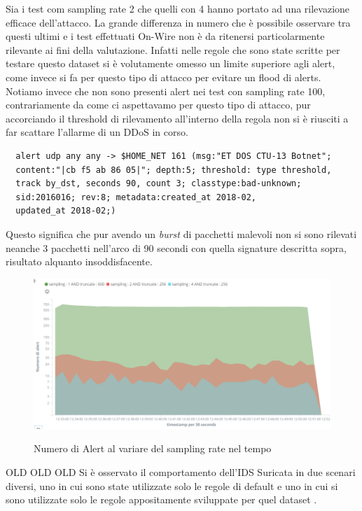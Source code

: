 \documentclass[12pt,a4paper,openright,twoside]{report}
\begin{document}
Sia i test com sampling rate 2 che quelli con 4 hanno portato ad una rilevazione efficace
dell'attacco. La grande differenza in numero che \`e possibile osservare tra questi ultimi e
i test effettuati On-Wire non \`e da ritenersi particolarmente rilevante ai fini della
valutazione. Infatti nelle regole che sono state scritte per testare questo dataset
si \`e volutamente omesso un limite superiore agli alert, come invece si fa per questo
tipo di attacco per evitare un flood di alerts.
Notiamo invece che non sono presenti alert nei test con sampling rate 100, contrariamente
da come ci aspettavamo per questo tipo di attacco, pur accorciando il threshold di rilevamento
all'interno della regola non si \`e riusciti a far scattare l'allarme di un DDoS in corso.
\begin{verbatim}
  alert udp any any -> $HOME_NET 161 (msg:"ET DOS CTU-13 Botnet";
  content:"|cb f5 ab 86 05|"; depth:5; threshold: type threshold,
  track by_dst, seconds 90, count 3; classtype:bad-unknown;
  sid:2016016; rev:8; metadata:created_at 2018-02,
  updated_at 2018-02;)
\end{verbatim}

Questo significa che pur avendo un {\it burst} di pacchetti malevoli non si sono
rilevati neanche 3 pacchetti nell'arco di 90 secondi con quella signature descritta
sopra, risultato alquanto insoddisfacente.

\begin{figure}[h!]
\begin{center}                          %
  \includegraphics[width=\textwidth]{images/CTU-time.png}
  \caption{Numero di Alert al variare del sampling rate nel tempo}\label{ctu:time}
  \label{}
\end{center}
\end{figure}

\newpage
\clearpage
OLD OLD OLD
Si \`e osservato il comportamento dell'IDS Suricata in due scenari diversi,
uno in cui sono state utilizzate solo le regole di default e uno in cui si
sono utilizzate solo le regole appositamente sviluppate per quel dataset \cite{EXP15}.
\end{document}
